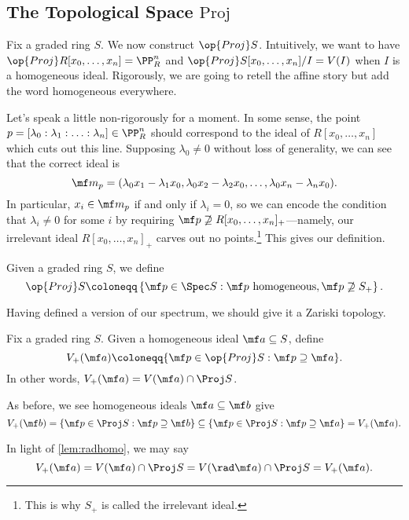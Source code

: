 \documentclass[../notes.tex]{subfiles}
\begin{document}
\subsection{The Topological Space \texorpdfstring{$\mathrm{Proj}$}{\textrm{Proj}}}
Fix a graded ring $S$. We now construct $\op{Proj}S$. Intuitively, we want to have $\op{Proj}R[x_0,\ldots,x_n]=\PP^n_R$ and $\op{Proj}S[x_0,\ldots,x_n]/I=V(I)$ when $I$ is a homogeneous ideal. Rigorously, we are going to retell the affine story but add the word homogeneous everywhere.

Let's speak a little non-rigorously for a moment. In some sense, the point $p=[\lambda_0:\lambda_1:\ldots:\lambda_n]\in\PP^n_R$ should correspond to the ideal of $R[x_0,\ldots,x_n]$ which cuts out this line. Supposing $\lambda_0\ne0$ without loss of generality, we can see that the correct ideal is
\[\mf m_p=(\lambda_0x_1-\lambda_1x_0,\lambda_0x_2-\lambda_2x_0,\ldots,\lambda_0x_n-\lambda_nx_0).\]
In particular, $x_i\in\mf m_p$ if and only if $\lambda_i=0$, so we can encode the condition that $\lambda_i\ne0$ for some $i$ by requiring $\mf p\not\supseteq R[x_0,\ldots,x_n]_+$---namely, our irrelevant ideal $R[x_0,\ldots,x_n]_+$ carves out no points.\footnote{This is why $S_+$ is called the irrelevant ideal.} This gives our definition.
\begin{defihelper} 
	Given a graded ring $S$, we define
	\[\op{Proj}S\coloneqq\left\{\mf p\in\Spec S:\mf p\text{ homogeneous},\mf p\not\supseteq S_+\right\}.\]
\end{defihelper}
Having defined a version of our spectrum, we should give it a Zariski topology.
\begin{defihelper} 
	Fix a graded ring $S$. Given a homogeneous ideal $\mf a\subseteq S$, define
	\[V_+(\mf a)\coloneqq\{\mf p\in\op{Proj}S:\mf p\supseteq\mf a\}.\]
	In other words, $V_+(\mf a)=V(\mf a)\cap\Proj S$.
\end{defihelper}
\begin{remark} \label{rem:vreversescontain}
	As before, we see homogeneous ideals $\mf a\subseteq\mf b$ give
	\[V_+(\mf b)=\{\mf p\in\Proj S:\mf p\supseteq\mf b\}\subseteq\{\mf p\in\Proj S:\mf p\supseteq\mf a\}=V_+(\mf a).\]
\end{remark}
\begin{remark}
	In light of \autoref{lem:radhomo}, we may say
	\[V_+(\mf a)=V(\mf a)\cap\Proj S=V(\rad\mf a)\cap\Proj S=V_+(\mf a).\]
\end{remark}
\end{document}
